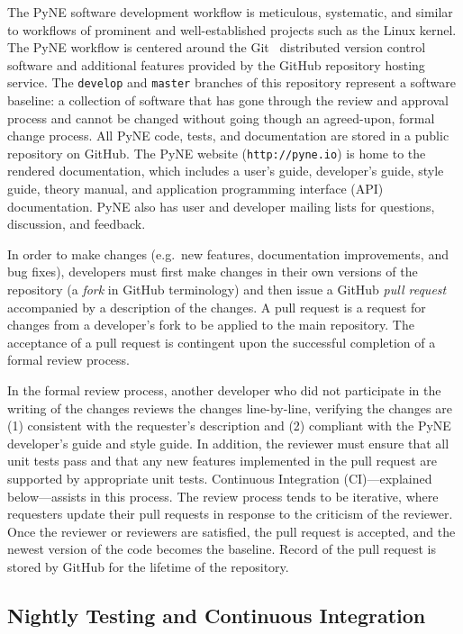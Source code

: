 \documentclass{anstrans}
\begin{document}
The PyNE software development workflow is meticulous, systematic, and similar
to workflows of prominent and well-established projects such as the Linux kernel.
The PyNE workflow is centered around the Git~\cite{git_2014} distributed version control software
and additional features provided by the GitHub repository hosting service.
The \texttt{develop} and \texttt{master} branches of this repository represent
a software baseline: a collection of software that has gone through the review and
approval process and cannot be changed without going though an agreed-upon, formal change process.
All PyNE code, tests, and documentation are stored in a public
repository on GitHub. The PyNE website (\texttt{http://pyne.io}) is home to the
rendered documentation, which includes a user's guide, developer's guide, style
guide, theory manual, and application programming interface (API) documentation.
PyNE also has user and developer mailing lists for questions, discussion, and feedback.

In order to make changes (e.g.\ new features, documentation improvements, and
bug fixes), developers must first make changes in their own versions of the
repository (a \emph{fork} in GitHub terminology) and then issue a GitHub \emph{pull
request} accompanied by a description of the changes. A pull request
is a request for changes from a developer's fork to be applied to the main
repository. The acceptance of a pull request is contingent upon the
successful completion of a formal review process.

In the formal review process, another developer who did not participate in the writing of the changes
reviews the changes line-by-line, verifying the changes are (1) consistent with
the requester's description and (2) compliant with the PyNE
developer's guide and style guide. In addition, the reviewer must
ensure that all unit tests pass and that
any new features implemented in the pull request are supported by appropriate unit
tests. Continuous Integration (CI)---explained below---assists in this process.
The review process tends to be iterative, where requesters update their pull
requests in response to the criticism of the reviewer. Once the reviewer or
reviewers are satisfied, the pull request is accepted, and the newest version of the
code becomes the baseline. Record of the pull request is stored by GitHub for the lifetime of the repository.

\subsection{Nightly Testing and Continuous Integration} 
\end{document}
